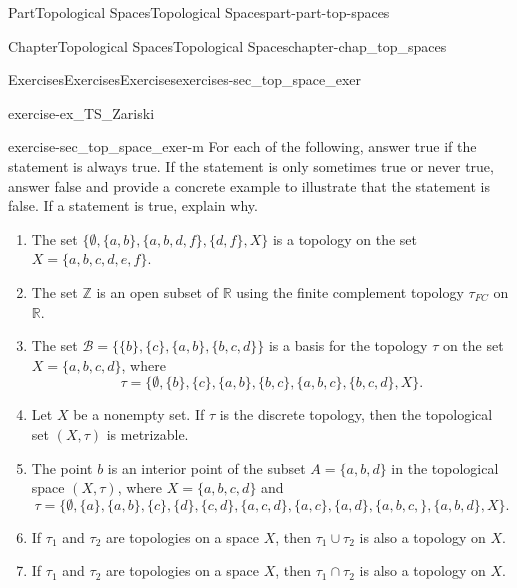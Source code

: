 \documentclass[oneside,10pt,]{book}
\numberwithin{equation}{chapter}
\newcommand{\Z}{\mathbb{Z}}
\newcommand{\R}{\mathbb{R}}
\begin{document}
\begin{partptx}{Part}{Topological Spaces}{}{Topological Spaces}{}{}{part-part-top-spaces}
\begin{chapterptx}{Chapter}{Topological Spaces}{}{Topological Spaces}{}{}{chapter-chap_top_spaces}
\begin{exercises-section}{Exercises}{Exercises}{}{Exercises}{}{}{exercises-sec_top_space_exer}
\begin{divisionexercise}{12}{}{}{exercise-ex_TS_Zariski}
\begin{enumerate}[font=\bfseries,label=(\alph*),ref=\alph*]
\end{enumerate}%
\end{divisionexercise}%
\begin{divisionexercise}{13}{}{}{exercise-sec_top_space_exer-m}%
For each of the following, answer true if the statement is always true. If the statement is only sometimes true or never true, answer false and provide a concrete example to illustrate that the statement is false. If a statement is true, explain why.%
\begin{enumerate}[font=\bfseries,label=(\alph*),ref=\alph*]%
\item{}The set \(\{\emptyset, \{a,b\}, \{a,b,d,f\}, \{d,f\},X\}\) is a topology on the set \(X = \{a,b,c,d,e,f\}\).%
\item{}The set \(\Z\) is an open subset of \(\R\) using the finite complement topology \(\tau_{FC}\) on \(\R\).%
\item{}The set \(\mathcal{B} = \{\{b\},\{c\}, \{a,b\}, \{b,c,d\}\}\) is a basis for the topology \(\tau\) on the set \(X = \{a,b,c,d\}\), where%
\begin{equation*}
\tau = \{\emptyset, \{b\}, \{c\}, \{a,b\}, \{b,c\}, \{a,b,c\}, \{b,c,d\}, X\}\text{.}
\end{equation*}
%
\item{}Let \(X\) be a nonempty set. If \(\tau\) is the discrete topology, then the topological set \((X,\tau)\) is metrizable.%
\item{}The point \(b\) is an interior point of the subset \(A = \{a,b,d\}\) in the topological space \((X,\tau)\), where \(X = \{a,b,c,d\}\) and%
\begin{equation*}
\tau = \{\emptyset, \{a\}, \{a,b\}, \{c\}, \{d\}, \{c,d\}, \{a,c,d\}, \{a,c\}, \{a,d\}, \{a,b,c,\}, \{a,b,d\}, X\}\text{.}
\end{equation*}
%
\item{}If \(\tau_1\) and \(\tau_2\) are topologies on a space \(X\), then \(\tau_1 \cup \tau_2\) is also a topology on \(X\).%
\item{}If \(\tau_1\) and \(\tau_2\) are topologies on a space \(X\), then \(\tau_1 \cap \tau_2\) is also a topology on \(X\).%
\end{enumerate}%
\end{divisionexercise}%
\end{exercises-section}
\end{chapterptx}
%
\typeout{************************************************}
\typeout{************************************************}

\end{partptx}
\end{document}
